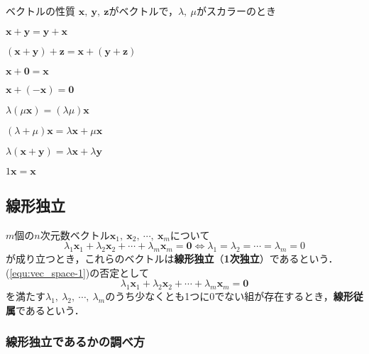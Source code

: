 \begin{kousiki}{ベクトルの性質}
	$\bm{x},\ \bm{y},\ \bm{z}$がベクトルで，$\lambda,\ \mu$がスカラーのとき
	\begin{enumerate}[label=\textbf{[\arabic*]}, labelsep=10pt, leftmargin=23pt]
		\item $\bm{x} + \bm{y} = \bm{y} + \bm{x}$
		\item $(\bm{x} + \bm{y}) + \bm{z} = \bm{x} + (\bm{y} + \bm{z})$
		\item $\bm{x} + \bm{0} = \bm{x}$
		\item $\bm{x} + (-\bm{x}) = \bm{0}$
		\item $\lambda(\mu\bm{x}) = (\lambda\mu)\bm{x}$
		\item $(\lambda + \mu)\bm{x} = \lambda\bm{x} + \mu\bm{x}$
		\item $\lambda(\bm{x} + \bm{y}) = \lambda\bm{x} + \lambda\bm{y}$
		\item $1\bm{x} = \bm{x}$
	\end{enumerate}
\end{kousiki}



\subsection{線形独立}

$m$個の$n$次元数ベクトル$\bm{x}_1,\ \bm{x}_2,\ \cdots,\ \bm{x}_m$について
\begin{equation}
	\lambda_1\bm{x}_1 + \lambda_2\bm{x}_2 + \cdots + \lambda_m\bm{x}_m = \bm{0} \iff \lambda_1 = \lambda_2 = \cdots = \lambda_m = 0 \label{equ:vec_space-1}
\end{equation}
が成り立つとき，これらのベクトルは\textbf{線形独立}（\textbf{1次独立}）であるという．(\ref{equ:vec_space-1})の否定として
\begin{equation*}
	\lambda_1\bm{x}_1 + \lambda_2\bm{x}_2 + \cdots + \lambda_m\bm{x}_m = \bm{0}
\end{equation*}
を満たす$\lambda_1,\ \lambda_2,\ \cdots,\ \lambda_m$のうち少なくとも1つに$0$でない組が存在するとき，\textbf{線形従属}であるという．

\subsubsection*{線形独立であるかの調べ方}

